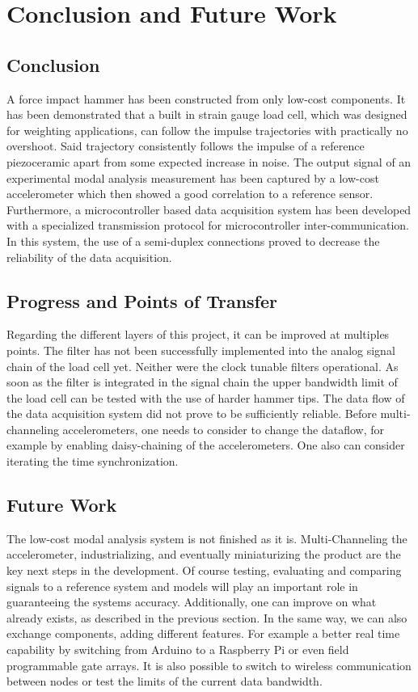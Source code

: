\chapter{Conclusion and Future Work}

\section{Conclusion}
A force impact hammer has been constructed from only low-cost components. It has been demonstrated that a built in strain gauge load cell, which was designed for weighting applications, can follow the impulse trajectories with practically no overshoot. Said trajectory consistently follows the impulse of a reference piezoceramic apart from some expected increase in noise. The output signal of an experimental modal analysis measurement has been captured by a low-cost accelerometer which then showed a good correlation to a reference sensor. Furthermore, a microcontroller based data acquisition system has been developed with a specialized transmission protocol for microcontroller inter-communication. In this system, the use of a semi-duplex connections proved to decrease the reliability of the data acquisition.

\section{Progress and Points of Transfer}
Regarding the different layers of this project, it can be improved at multiples points. The filter has not been successfully implemented into the analog signal chain of the load cell yet. Neither were the clock tunable filters operational. As soon as the filter is integrated in the signal chain the upper bandwidth limit of the load cell can be tested with the use of harder hammer tips.
The data flow of the data acquisition system did not prove to be sufficiently reliable. Before multi-channeling accelerometers, one needs to consider to change the dataflow, for example by enabling daisy-chaining of the accelerometers.
One also can consider iterating the time synchronization.

\section{Future Work}
The low-cost modal analysis system is not finished as it is. Multi-Channeling the accelerometer, industrializing, and eventually miniaturizing the product are the key next steps in the development. Of course testing, evaluating and comparing signals to a reference system and models will play an important role in guaranteeing the systems accuracy. Additionally, one can improve on what already exists, as described in the previous section. In the same way, we can also exchange components, adding different features. For example a better real time capability by switching from Arduino to a Raspberry Pi or even field programmable gate arrays. It is also possible to switch to wireless communication between nodes or test the limits of the current data bandwidth.

